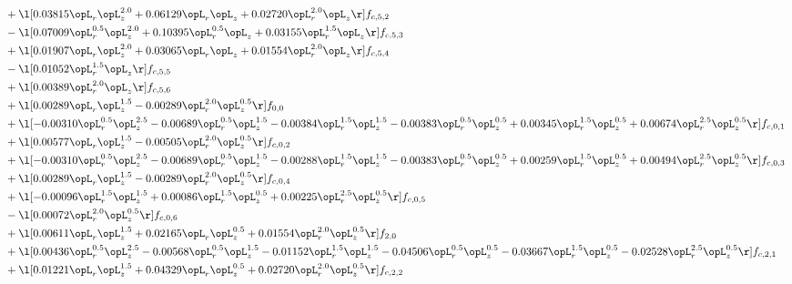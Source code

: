 \begin{alignat}{2}
& + \l[  0.03815 \opL_r \opL_z^{2.0} +  0.06129 \opL_r \opL_z +  0.02720 \opL_r^{2.0} \opL_z  \r] f_{c,5,2} \nonumber \\ 
& - \l[  0.07009 \opL_r^{0.5} \opL_z^{2.0} +  0.10395 \opL_r^{0.5} \opL_z +  0.03155 \opL_r^{1.5} \opL_z  \r] f_{c,5,3} \nonumber \\ 
& + \l[  0.01907 \opL_r \opL_z^{2.0} +  0.03065 \opL_r \opL_z +  0.01554 \opL_r^{2.0} \opL_z  \r] f_{c,5,4} \nonumber \\ 
& - \l[  0.01052 \opL_r^{1.5} \opL_z  \r] f_{c,5,5} \nonumber \\ 
& + \l[  0.00389 \opL_r^{2.0} \opL_z  \r] f_{c,5,6} \nonumber \\ 
& + \l[  0.00289 \opL_r \opL_z^{1.5}   -0.00289 \opL_r^{2.0} \opL_z^{0.5}  \r] f_{0,0} \nonumber \\ 
& + \l[  -0.00310 \opL_r^{0.5} \opL_z^{2.5}   -0.00689 \opL_r^{0.5} \opL_z^{1.5}   -0.00384 \opL_r^{1.5} \opL_z^{1.5}   -0.00383 \opL_r^{0.5} \opL_z^{0.5} +  0.00345 \opL_r^{1.5} \opL_z^{0.5} +  0.00674 \opL_r^{2.5} \opL_z^{0.5}  \r] f_{c,0,1} \nonumber \\ 
& + \l[  0.00577 \opL_r \opL_z^{1.5}   -0.00505 \opL_r^{2.0} \opL_z^{0.5}  \r] f_{c,0,2} \nonumber \\ 
& + \l[  -0.00310 \opL_r^{0.5} \opL_z^{2.5}   -0.00689 \opL_r^{0.5} \opL_z^{1.5}   -0.00288 \opL_r^{1.5} \opL_z^{1.5}   -0.00383 \opL_r^{0.5} \opL_z^{0.5} +  0.00259 \opL_r^{1.5} \opL_z^{0.5} +  0.00494 \opL_r^{2.5} \opL_z^{0.5}  \r] f_{c,0,3} \nonumber \\ 
& + \l[  0.00289 \opL_r \opL_z^{1.5}   -0.00289 \opL_r^{2.0} \opL_z^{0.5}  \r] f_{c,0,4} \nonumber \\ 
& + \l[  -0.00096 \opL_r^{1.5} \opL_z^{1.5} +  0.00086 \opL_r^{1.5} \opL_z^{0.5} +  0.00225 \opL_r^{2.5} \opL_z^{0.5}  \r] f_{c,0,5} \nonumber \\ 
& - \l[  0.00072 \opL_r^{2.0} \opL_z^{0.5}  \r] f_{c,0,6} \nonumber \\ 
& + \l[  0.00611 \opL_r \opL_z^{1.5} +  0.02165 \opL_r \opL_z^{0.5} +  0.01554 \opL_r^{2.0} \opL_z^{0.5}  \r] f_{2,0} \nonumber \\ 
& + \l[  0.00436 \opL_r^{0.5} \opL_z^{2.5}   -0.00568 \opL_r^{0.5} \opL_z^{1.5}   -0.01152 \opL_r^{1.5} \opL_z^{1.5}   -0.04506 \opL_r^{0.5} \opL_z^{0.5}   -0.03667 \opL_r^{1.5} \opL_z^{0.5}   -0.02528 \opL_r^{2.5} \opL_z^{0.5}  \r] f_{c,2,1} \nonumber \\ 
& + \l[  0.01221 \opL_r \opL_z^{1.5} +  0.04329 \opL_r \opL_z^{0.5} +  0.02720 \opL_r^{2.0} \opL_z^{0.5}  \r] f_{c,2,2} \nonumber \\ 

\end{alignat}
